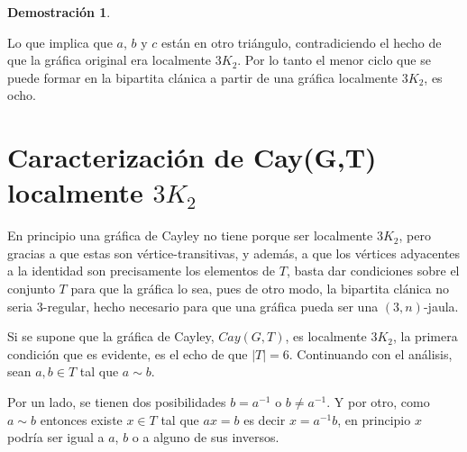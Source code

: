 \documentclass[11pt]{book}
\theoremstyle{definition}
\newtheorem{demostration}{Demostración}
\begin{document}
\begin{demostration}
\begin{figure}[htb]
  \centering
  \caption{} \label{triancontriang}
\end{figure}

Lo que implica que $a$, $b$ y $c$ están en otro triángulo,
contradiciendo el hecho de que la gráfica original era localmente
$3K_2$. Por lo tanto el menor ciclo que se puede formar en la
bipartita clánica a partir de una gráfica localmente $3K_2$, es ocho.
\end{demostration}



\newpage

\section {Caracterización de Cay(G,T) localmente $3K_2$}



En principio una gráfica de Cayley no tiene porque ser localmente
$3K_2$, pero gracias a que estas son vértice-transitivas, y además, a
que los vértices adyacentes a la identidad son precisamente los
elementos de $T$, basta dar condiciones sobre el conjunto $T$ para que
la gráfica lo sea, pues de otro modo, la bipartita clánica no seria
$3$-regular, hecho necesario para que una gráfica pueda ser una
$(3,n)$-jaula.



Si se supone que la gráfica de Cayley, $Cay(G, T)$, es localmente
$3K_2$, la primera condición que es evidente, es el echo de que
$|T|=6$. Continuando con el análisis, sean $a, b \in T$ tal que $a
\sim b$.

Por un lado, se tienen dos posibilidades $b= a^{-1}$ o $b\neq
a^{-1}$. Y por otro, como $a\sim b$ entonces existe $x\in T$ tal que
$ax=b$ es decir $x=a^{-1}b$, en principio $x$ podría ser igual a $a$,
$b$ o a alguno de sus inversos.

\end{document}
